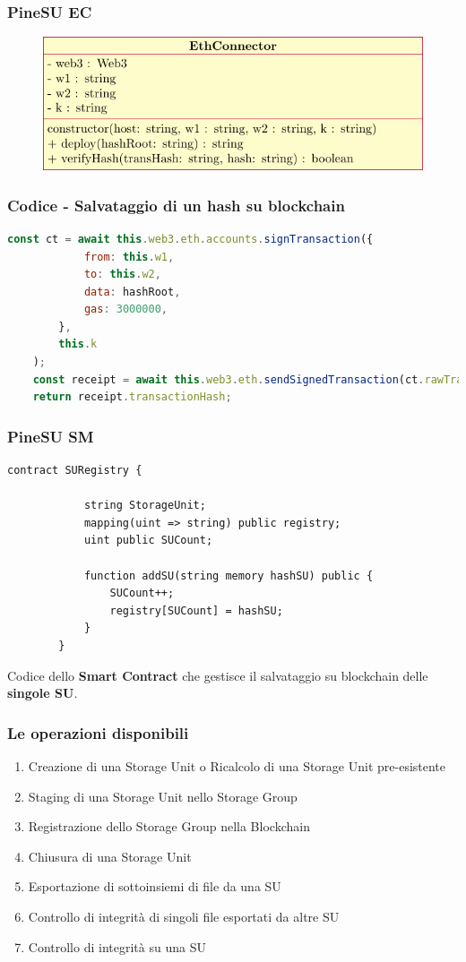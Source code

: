 \documentclass{beamer}
\begin{document}
\begin{frame}
	\frametitle{PineSU EC}
	\begin{figure}
		\includegraphics[width=\textwidth]{figures/umlec.pdf}
	\end{figure}
\end{frame}

\begin{frame}[fragile]
	\frametitle{Codice - Salvataggio di un hash su blockchain}
	\begin{lstlisting}[language=JavaScript, numbers=none]
	const ct = await this.web3.eth.accounts.signTransaction({
			from: this.w1,
			to: this.w2,
			data: hashRoot,
			gas: 3000000,
		},
		this.k
	);
	const receipt = await this.web3.eth.sendSignedTransaction(ct.rawTransaction);
	return receipt.transactionHash;
	\end{lstlisting}
\end{frame}

\begin{frame}[fragile]
	\frametitle{PineSU SM}
	\begin{lstlisting}[language=Solidity, numbers=none]
		contract SURegistry {
		
			string StorageUnit;
			mapping(uint => string) public registry;
			uint public SUCount;
		
			function addSU(string memory hashSU) public {
				SUCount++;
				registry[SUCount] = hashSU;
			}
		}
	\end{lstlisting}
	Codice dello \textbf{Smart Contract} che gestisce il salvataggio su blockchain delle \textbf{singole SU}.
\end{frame}

\begin{frame}
	\frametitle{Le operazioni disponibili}
	\begin{enumerate}%
		\item Creazione di una Storage Unit o Ricalcolo di una Storage Unit pre-esistente
		\item Staging di una Storage Unit nello Storage Group
		\item Registrazione dello Storage Group nella Blockchain
		\item Chiusura di una Storage Unit
		\item Esportazione di sottoinsiemi di file da una SU
		\item Controllo di integrità di singoli file esportati da altre SU
		\item Controllo di integrità su una SU
	\end{enumerate}
\end{frame}
\end{document}
